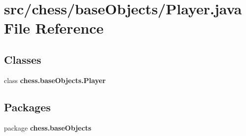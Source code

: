 \section{src/chess/base\+Objects/\+Player.java File Reference}
\label{_player_8java}
\subsection*{Classes}
\begin{DoxyCompactItemize}
\item 
class {\bf chess.\+base\+Objects.\+Player}
\end{DoxyCompactItemize}
\subsection*{Packages}
\begin{DoxyCompactItemize}
\item 
package {\bf chess.\+base\+Objects}
\end{DoxyCompactItemize}
